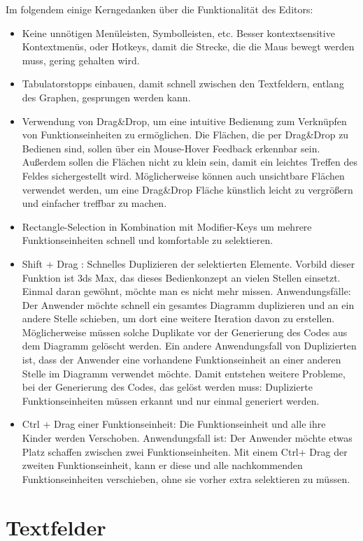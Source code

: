 \bigskip
Im folgendem einige Kerngedanken über die Funktionalität des Editors:

\begin{itemize}
\item Keine unnötigen Menüleisten, Symbolleisten, etc. Besser kontextsensitive
Kontextmenüs, oder Hotkeys,  damit die Strecke, die die Maus bewegt werden muss, gering
gehalten wird.
\item Tabulatorstopps einbauen, damit schnell zwischen den Textfeldern, entlang des
Graphen, gesprungen werden kann.
\item Verwendung von Drag\&Drop, um eine intuitive Bedienung zum Verknüpfen von
Funktionseinheiten zu ermöglichen. Die Flächen, die per Drag\&Drop zu Bedienen
sind, sollen über ein Mouse-Hover Feedback erkennbar sein. Außerdem sollen die
Flächen nicht zu klein sein, damit ein leichtes Treffen des Feldes
sichergestellt wird. Möglicherweise können auch unsichtbare Flächen verwendet
werden, um eine Drag\&Drop Fläche künstlich leicht zu vergrößern und einfacher treffbar zu machen.
\item Rectangle-Selection in Kombination mit Modifier-Keys um mehrere Funktionseinheiten
schnell und komfortable zu selektieren.
\item Shift + Drag : Schnelles Duplizieren der selektierten Elemente. Vorbild dieser
Funktion ist 3ds Max, das dieses Bedienkonzept an vielen Stellen einsetzt.
Einmal daran gewöhnt, möchte man es nicht mehr missen. Anwendungsfälle:
Der Anwender möchte  schnell ein gesamtes Diagramm duplizieren und an ein andere Stelle schieben, um
dort eine weitere Iteration davon zu erstellen. Möglicherweise müssen solche
Duplikate vor der Generierung des Codes aus dem Diagramm gelöscht werden.
Ein andere Anwendungsfall von Duplizierten ist, dass der Anwender eine vorhandene
Funktionseinheit an einer anderen Stelle im Diagramm verwendet möchte. Damit
entstehen weitere Probleme, bei der Generierung des Codes, das gelöst werden
muss: Duplizierte Funktionseinheiten müssen erkannt und nur einmal generiert werden.
\item Ctrl + Drag einer Funktionseinheit: Die Funktionseinheit und alle ihre Kinder werden
Verschoben. Anwendungsfall ist: Der Anwender möchte etwas Platz schaffen
zwischen zwei Funktionseinheiten. Mit einem Ctrl+ Drag der zweiten Funktionseinheit,
kann er diese und alle nachkommenden Funktionseinheiten verschieben, ohne sie
vorher extra selektieren zu müssen.
\end{itemize}

\section{Textfelder}

